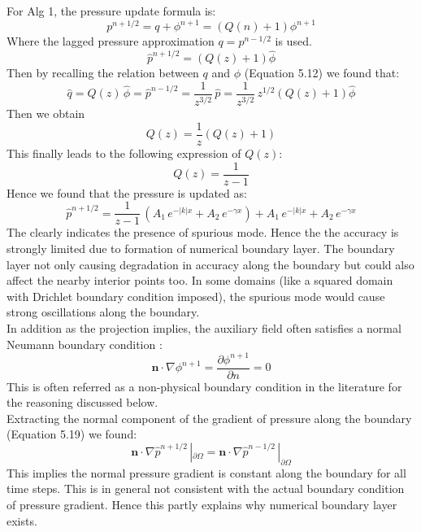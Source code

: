 For Alg 1, the pressure update formula is:
\begin{equation}
p^{n+1/2} = q + \phi^{n+1} = (Q(n) + 1)\phi^{n+1}
\end{equation}
Where the lagged pressure approximation $q = p^{n-1/2}$ is used. \\
\begin{equation}
\hat{p}^{n+1/2} = (Q(z)+1)\hat{\phi}
\end{equation}
Then by recalling the relation between $q$ and $\phi$ (Equation 5.12) we found that:
\begin{equation*}
\hat{q} = Q(z)\,\hat{\phi} = \hat{p}^{n-1/2} = \dfrac{1}{z^{3/2}}\,\hat{p} = \dfrac{1}{z^{3/2}} \, z^{1/2} (Q(z) + 1) \hat{\phi}
\end{equation*}
Then we obtain
\begin{equation*}
Q(z) = \dfrac{1}{z} (Q(z) + 1)
\end{equation*}
This finally leads to the following expression of $Q(z)$:
\begin{equation}
Q(z) = \dfrac{1}{z-1}
\end{equation}
Hence we found that the pressure is updated as:
\begin{equation}
\hat{p}^{n+1/2} = \dfrac{1}{z-1}\,(A_1\,e^{-|k|x} + A_2 \,e^{-\gamma x}) + A_1\,e^{-|k|x} + A_2 \,e^{-\gamma x}
\end{equation}
The clearly indicates the presence of spurious mode. Hence the the accuracy is strongly limited due to formation of numerical boundary layer. The boundary layer not only causing degradation in accuracy along the boundary but could also affect the nearby interior points too. In some domains (like a squared domain with Drichlet boundary condition imposed), the spurious mode would cause strong oscillations along the boundary.\\

In addition as the projection implies, the auxiliary field often satisfies a normal Neumann boundary condition :
\begin{equation*}
\textbf{n} \cdot \nabla \phi^{n+1} = \dfrac{\partial \phi^{n+1}}{\partial n} = 0
\end{equation*}
This is often referred as a non-physical boundary condition in the literature \cite{strikwerda1999accuracy, guermond2004error, brown2001accurate} for the reasoning discussed below.\\
Extracting the normal component of the gradient of pressure along the boundary (Equation 5.19) we found:
\begin{equation}
\textbf{n} \cdot \nabla \hat{p}^{n+1/2}\,|_{\partial \Omega} = \textbf{n} \cdot \nabla \hat{p}^{n-1/2}\,|_{\partial \Omega}
\end{equation}
This implies the normal pressure gradient is constant along the boundary for all time steps. This is in general not consistent with the actual boundary condition of pressure gradient. Hence this partly explains why numerical boundary layer exists.\\

